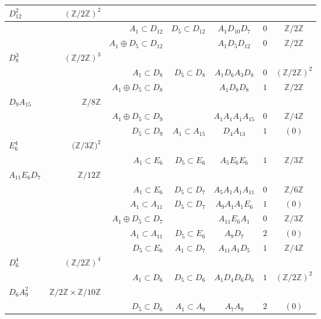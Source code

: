 \documentclass{amsart}
\begin{document}
\begin{table}
\begin{center}
\begin{tabular}{|l|r|r|r|c|c|c|}
 $D_{12}^2$    &  $(\mathbb Z /{2 \mathbb Z})^2$ & & & & &\\ \hline
&   & $A_1 \subset D_{12}$ & $D_5 \subset D_{12}$  & $A_1 D_{10} D_{7}$ & $0$ & $\mathbb Z /{2 \mathbb Z}$\\ \hline
&   & $A_1\oplus D_5 \subset D_{12}$ &   & $A_1 D_5 D_{12}$ & $0$ & $\mathbb Z /{2 \mathbb Z}$\\ \hline
 $D_8^3$    &  $(\mathbb Z /{2 \mathbb Z})^3$ & & & & &\\ \hline
&   & $A_1 \subset D_{8}$ & $D_5 \subset D_{8}$  & $A_1 D_{6}A_3 D_{8}$ & $0$ & $(\mathbb Z /{2 \mathbb Z})^2 $\\ \hline
&   & $A_1\oplus D_5 \subset D_{8}$ &   & $A_1 D_8 D_{8}$ & $1$ & $\mathbb Z /{2 \mathbb Z}$\\ \hline
 $D_9 A_{15}$    &  $\mathbb Z /{8 \mathbb Z}$ & & & & &\\ \hline
&   & $A_1\oplus D_5 \subset D_{9}$ &   & $ A_1 A_1 A_1 A_{15}$ & $0$ & $\mathbb Z /{4 \mathbb Z}$\\ \hline
&   & $D_5 \subset D_{9}$ & $A_1 \subset A_{15}$  & $D_4 A_{13}$ & $1$ & $(0)$\\ \hline
 $E_6^4$    &  $(\mathbb Z /{3 \mathbb Z)^2}$ & & & & &\\ \hline
&   & $A_1 \subset E_6$ & $D_5 \subset E_6$  & $A_5 E_6 E_6$ & $1$ & $\mathbb Z /{3 \mathbb Z}$\\ \hline
 $ A_{11} E_6 D_7$    &  $\mathbb Z /{12 \mathbb Z}$ & & & & &\\ \hline
&   & $A_1 \subset E_6$ & $D_5 \subset D_7$  & $A_5 A_1 A_1 A_{11}$ & $0$ & $\mathbb Z /{6 \mathbb Z}$\\ \hline
&   & $A_1 \subset A_{11}$ & $D_5 \subset D_7$  & $A_9 A_1 A_1 E_6$ & $1$ & $(0)$\\ \hline
&   & $A_1\oplus D_5 \subset D_{7}$ &   & $A_{11}E_6  A_1 $ & $0$ & $\mathbb Z /{3 \mathbb Z}$\\ \hline
&   & $A_1 \subset A_{11}$ & $D_5 \subset E_6$  & $ A_9 D_7$ & $2$ & $(0)$\\ \hline
&   & $D_5 \subset E_6$ & $A_1 \subset D_7$  & $ A_{11} A_1 D_5$ & $1$ & $\mathbb Z /{4 \mathbb Z}$\\ \hline
 $D_6^4$    &  $(\mathbb Z /{2 \mathbb Z})^4$ & & & & &\\ \hline
&   & $A_1 \subset D_6$ & $D_5 \subset D_6$  & $ A_1 D_4 D_6 D_6$ & $1$ & $(\mathbb Z /{2 \mathbb Z})^2$\\ \hline
 $D_6 A_9^2$    &  $\mathbb Z /{2\mathbb Z}\times \mathbb Z /{10\mathbb Z} $ & & & & &\\ \hline
&   & $D_5 \subset D_6$ & $A_1 \subset A_9$  & $ A_{7} A_9$ & $2$ & $(0)$\\ \hline


\end{tabular}
\end{center}
\end{table}
\end{document}
